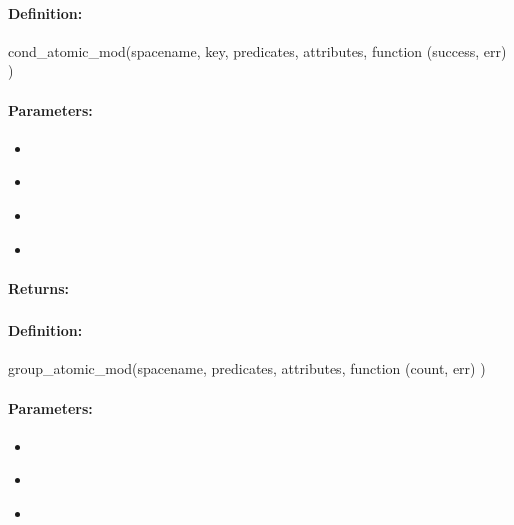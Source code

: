 \paragraph{Definition:}
\begin{javascriptcode}
cond_atomic_mod(spacename, key, predicates, attributes, function (success, err) {})
\end{javascriptcode}
\paragraph{Parameters:}
\begin{itemize}[noitemsep]
\item {}\\

\item {}\\

\item {}\\

\item {}\\

\end{itemize}

\paragraph{Returns:}


\pagebreak
\subsubsection{}
\label{api:nodejs:group_atomic_mod}


\paragraph{Definition:}
\begin{javascriptcode}
group_atomic_mod(spacename, predicates, attributes, function (count, err) {})
\end{javascriptcode}
\paragraph{Parameters:}
\begin{itemize}[noitemsep]
\item {}\\

\item {}\\

\item {}\\

\end{itemize}

